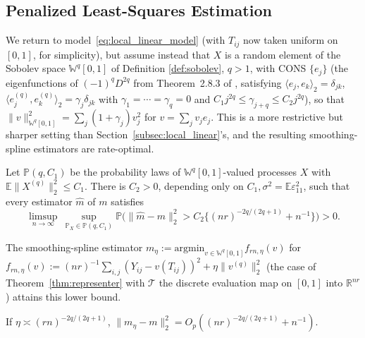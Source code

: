 \subsection{Penalized Least-Squares Estimation}
\label{subsec:penalized_ls_estimation}

We return to model~\eqref{eq:local_linear_model} (with $T_{ij}$ now taken
uniform on $[0,1]$, for simplicity), but assume instead that $X$ is a
random element of the Sobolev space $\mathbb{W}^q[0,1]$ of Definition
\ref{def:sobolev}, $q>1$, with CONS $\{e_j\}$ (the eigenfunctions of
$(-1)^qD^{2q}$ from Theorem~2.8.3 of \cite{hsingeubank2015}, satisfying
$\langle e_j,e_k\rangle_2=\delta_{jk}$, $\langle e_j^{(q)},e_k^{(q)}
\rangle_2=\gamma_j\delta_{jk}$ with $\gamma_1=\cdots=\gamma_q=0$ and
$C_1j^{2q}\leq\gamma_{j+q}\leq C_2j^{2q}$), so that $\|v\|_{\mathbb{W}^q
[0,1]}^2=\sum_j(1+\gamma_j)v_j^2$ for $v=\sum_jv_je_j$. This is a more
restrictive but sharper setting than Section~\ref{subsec:local_linear}'s,
and the resulting smoothing-spline estimators are rate-optimal.

\begin{theorem}
\label{thm:cai_yuan_lower_bound}
Let $\mathbb{P}(q,C_1)$ be the probability laws of $\mathbb{W}^q[0,1]$-valued
processes $X$ with $\mathbb{E}\|X^{(q)}\|_2^2\leq C_1$. There is $C_2>0$,
depending only on $C_1,\sigma^2=\mathbb{E}\varepsilon_{11}^2$, such that
every estimator $\widehat{m}$ of $m$ satisfies
\begin{equation}
\limsup_{n\to\infty}\ \sup_{\mathbb{P}_X\in\mathbb{P}(q,C_1)}\mathbb{P}
\big(\|\widehat{m}-m\|_2^2 > C_2\{(nr)^{-2q/(2q+1)}+n^{-1}\}\big) > 0.
\label{eq:minimax_lower_bound}
\end{equation}
\end{theorem}

The smoothing-spline estimator $m_\eta:=\mathrm{argmin}_{v\in\mathbb{W}^q
[0,1]}f_{rn,\eta}(v)$ for $f_{rn,\eta}(v):=(nr)^{-1}\sum_{i,j}(Y_{ij}-
v(T_{ij}))^2+\eta\|v^{(q)}\|_2^2$ (the case of Theorem~\ref{thm:representer}
with $\mathcal{T}$ the discrete evaluation map on $[0,1]$ into $\mathbb{R}^{
nr}$) attains this lower bound.

\begin{theorem}
\label{thm:penalized_mean_rate}
If $\eta\asymp(rn)^{-2q/(2q+1)}$, $\|m_\eta-m\|_2^2 = O_p((nr)^{-2q/(2q+1)}
+n^{-1})$.
\end{theorem}


